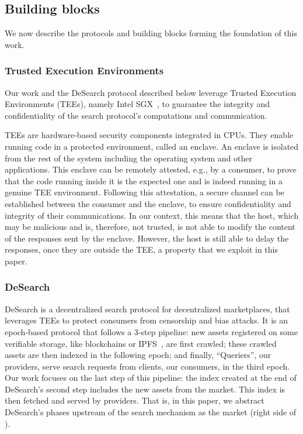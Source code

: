 \subsection{Building blocks}

We now describe the protocols and building blocks forming the foundation of this work. 

\subsubsection{Trusted Execution Environments}

Our work and the DeSearch protocol described below leverage Trusted Execution Environments (TEEs), namely Intel SGX~\cite{costan2016intel}, to guarantee the integrity and confidentiality of the search protocol's computations and communication.

TEEs are hardware-based security components integrated in CPUs.
They enable running code in a protected environment, called an enclave.
An enclave is isolated from the rest of the system including the operating system and other applications. 
This enclave can be remotely attested, e.g., by a consumer, to prove that the code running inside it is the expected one and is indeed running in a genuine TEE environment. 
Following this attestation, a secure channel can be established between the consumer and the enclave, to ensure confidentiality and integrity of their communications.
In our context, this means that the host, which may be malicious and is, therefore, not trusted, is not able to modify the content of the responses sent by the enclave.
However, the host is still able to delay the responses, once they are outside the TEE, a property that we exploit in this paper. 

\subsubsection{DeSearch~\cite{liBringingDecentralizedSearch2021}}

DeSearch is a decentralized search protocol for decentralized marketplaces, that leverages TEEs to protect consumers from censorship and bias attacks.
It is an epoch-based protocol that follows a 3-step pipeline: new assets registered on some verifiable storage, like blockchains or IPFS~\cite{doan2022towards}, are first crawled; these crawled assets are then indexed in the following epoch; and finally, ``Queriers'', our providers, serve search requests from clients, our consumers, in the third epoch. Our work focuses on the last step of this pipeline: the index created at the end of DeSearch's second step includes the new assets from the market.
This index is then fetched and served by providers.
That is, in this paper, we abstract DeSearch's phases upstream of the search mechanism as the market (right side of ).

